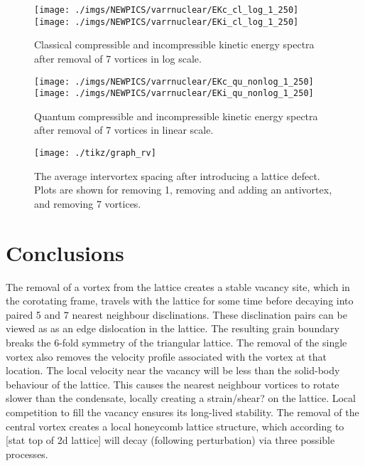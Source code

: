 \begin{figure}[htb]
    \texttt{[image: ./imgs/NEWPICS/varrnuclear/EKc\_cl\_log\_1\_250]}
    \texttt{[image: ./imgs/NEWPICS/varrnuclear/EKi\_cl\_log\_1\_250]}
    \caption{Classical compressible and incompressible kinetic energy spectra after removal of 7 vortices in log scale.}
\end{figure}
\begin{figure}[h!tb]
    \texttt{[image: ./imgs/NEWPICS/varrnuclear/EKc\_qu\_nonlog\_1\_250]}
    \texttt{[image: ./imgs/NEWPICS/varrnuclear/EKi\_qu\_nonlog\_1\_250]}
    \caption{Quantum compressible and incompressible kinetic energy spectra after removal of 7 vortices in linear scale.}
\end{figure}
\begin{figure}[htb]
    \texttt{[image: ./tikz/graph\_rv]}
    \caption{The average intervortex spacing after introducing a lattice defect. Plots are shown for removing 1, removing and adding an antivortex, and removing 7 vortices.}
\end{figure}




\section{Conclusions}\label{sec:conc}

The removal of a vortex from the lattice creates a stable vacancy site, which in the corotating frame, travels with the lattice for some time
before decaying into paired 5 and 7 nearest neighbour disclinations. These disclination pairs can be viewed as as an edge dislocation in the
lattice. The resulting grain boundary breaks the 6-fold symmetry of the triangular lattice. The removal of the single vortex also removes the
velocity profile associated with the vortex at that location. The local velocity near the vacancy will be less than the solid-body behaviour
of the lattice. This causes the nearest neighbour vortices to rotate slower than the condensate, locally creating a strain/shear? on the
lattice. Local competition to fill the vacancy ensures its long-lived stability. The removal of the central vortex creates a local honeycomb
lattice structure, which according to [stat top of 2d lattice] will decay (following perturbation) via three possible processes.

